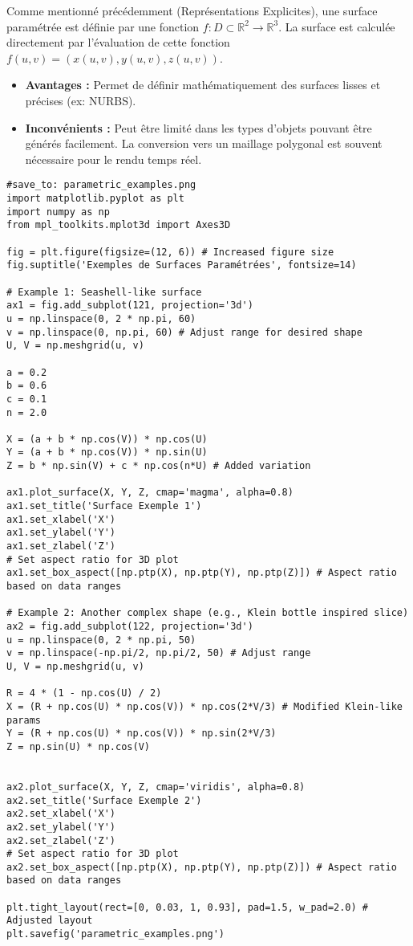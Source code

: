 \documentclass{article}
\begin{document}
Comme mentionné précédemment (Représentations Explicites), une surface paramétrée est définie par une fonction $f: D \subset \mathbb{R}^2 \to \mathbb{R}^3$. La surface est calculée directement par l'évaluation de cette fonction $f(u, v) = (x(u, v), y(u, v), z(u, v))$.
\begin{itemize}
    \item \textbf{Avantages :} Permet de définir mathématiquement des surfaces lisses et précises (ex: NURBS).
    \item \textbf{Inconvénients :} Peut être limité dans les types d'objets pouvant être générés facilement. La conversion vers un maillage polygonal est souvent nécessaire pour le rendu temps réel.
\end{itemize}

\begin{verbatim}
#save_to: parametric_examples.png
import matplotlib.pyplot as plt
import numpy as np
from mpl_toolkits.mplot3d import Axes3D

fig = plt.figure(figsize=(12, 6)) # Increased figure size
fig.suptitle('Exemples de Surfaces Paramétrées', fontsize=14)

# Example 1: Seashell-like surface
ax1 = fig.add_subplot(121, projection='3d')
u = np.linspace(0, 2 * np.pi, 60)
v = np.linspace(0, np.pi, 60) # Adjust range for desired shape
U, V = np.meshgrid(u, v)

a = 0.2
b = 0.6
c = 0.1
n = 2.0

X = (a + b * np.cos(V)) * np.cos(U)
Y = (a + b * np.cos(V)) * np.sin(U)
Z = b * np.sin(V) + c * np.cos(n*U) # Added variation

ax1.plot_surface(X, Y, Z, cmap='magma', alpha=0.8)
ax1.set_title('Surface Exemple 1')
ax1.set_xlabel('X')
ax1.set_ylabel('Y')
ax1.set_zlabel('Z')
# Set aspect ratio for 3D plot
ax1.set_box_aspect([np.ptp(X), np.ptp(Y), np.ptp(Z)]) # Aspect ratio based on data ranges

# Example 2: Another complex shape (e.g., Klein bottle inspired slice)
ax2 = fig.add_subplot(122, projection='3d')
u = np.linspace(0, 2 * np.pi, 50)
v = np.linspace(-np.pi/2, np.pi/2, 50) # Adjust range
U, V = np.meshgrid(u, v)

R = 4 * (1 - np.cos(U) / 2)
X = (R + np.cos(U) * np.cos(V)) * np.cos(2*V/3) # Modified Klein-like params
Y = (R + np.cos(U) * np.cos(V)) * np.sin(2*V/3)
Z = np.sin(U) * np.cos(V)


ax2.plot_surface(X, Y, Z, cmap='viridis', alpha=0.8)
ax2.set_title('Surface Exemple 2')
ax2.set_xlabel('X')
ax2.set_ylabel('Y')
ax2.set_zlabel('Z')
# Set aspect ratio for 3D plot
ax2.set_box_aspect([np.ptp(X), np.ptp(Y), np.ptp(Z)]) # Aspect ratio based on data ranges

plt.tight_layout(rect=[0, 0.03, 1, 0.93], pad=1.5, w_pad=2.0) # Adjusted layout
plt.savefig('parametric_examples.png')
\end{verbatim}
\end{document}
